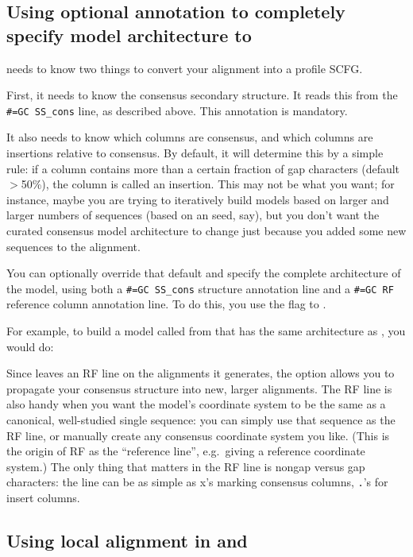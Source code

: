 \subsection{Using optional annotation to completely specify model architecture
to }

 needs to know two things to convert your alignment into
a profile SCFG.

First, it needs to know the consensus secondary structure. It reads
this from the {\small\verb+#=GC SS_cons+} line, as described
above. This annotation is mandatory.

It also needs to know which columns are consensus, and which columns
are insertions relative to consensus. By default, it will determine
this by a simple rule: if a column contains more than a certain
fraction of gap characters (default $>$50\%), the column is called an
insertion. This may not be what you want; for instance, maybe you are
trying to iteratively build models based on larger and larger numbers
of sequences (based on an  seed, say), but you don't
want the curated consensus model architecture to change just because
you added some new sequences to the alignment.

You can optionally override that default and specify the complete
architecture of the model, using both a {\small\verb+#=GC SS_cons+}
structure annotation line and a {\small\verb+#=GC RF+} reference
column annotation line.  To do this, you use the  flag to
.

For example, to build a model called  from
 that has the same architecture as , you
would do:


Since  leaves an RF line on the alignments it generates,
the  option allows you to propagate your consensus
structure into new, larger alignments. The RF line is also handy when
you want the model's coordinate system to be the same as a canonical,
well-studied single sequence: you can simply use that sequence as the
RF line, or manually create any consensus coordinate system you like.
(This is the origin of RF as the ``reference line'', e.g.\ giving a
reference coordinate system.) The only thing that matters in the RF
line is nongap versus gap characters: the line can be as simple as x's
marking consensus columns, \verb+.+'s for insert columns.

\subsection{Using local alignment in  and }

